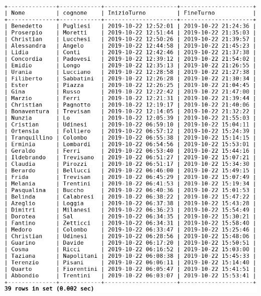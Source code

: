\begin{enumerate}
	\centerline{\includegraphics{src/queryIndici/assets/Query5.png}}
	
\end{enumerate}